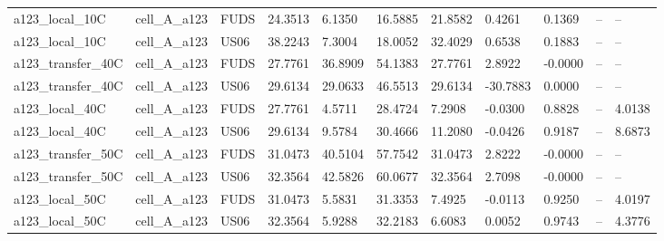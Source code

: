\begin{tabular}{lllllllllll}
a123\_local\_10C & cell\_A\_a123 & FUDS & 24.3513 & 6.1350 & 16.5885 & 21.8582 & 0.4261 & 0.1369 & -- & -- \\
a123\_local\_10C & cell\_A\_a123 & US06 & 38.2243 & 7.3004 & 18.0052 & 32.4029 & 0.6538 & 0.1883 & -- & -- \\
a123\_transfer\_40C & cell\_A\_a123 & FUDS & 27.7761 & 36.8909 & 54.1383 & 27.7761 & 2.8922 & -0.0000 & -- & -- \\
a123\_transfer\_40C & cell\_A\_a123 & US06 & 29.6134 & 29.0633 & 46.5513 & 29.6134 & -30.7883 & 0.0000 & -- & -- \\
a123\_local\_40C & cell\_A\_a123 & FUDS & 27.7761 & 4.5711 & 28.4724 & 7.2908 & -0.0300 & 0.8828 & -- & 4.0138 \\
a123\_local\_40C & cell\_A\_a123 & US06 & 29.6134 & 9.5784 & 30.4666 & 11.2080 & -0.0426 & 0.9187 & -- & 8.6873 \\
a123\_transfer\_50C & cell\_A\_a123 & FUDS & 31.0473 & 40.5104 & 57.7542 & 31.0473 & 2.8222 & -0.0000 & -- & -- \\
a123\_transfer\_50C & cell\_A\_a123 & US06 & 32.3564 & 42.5826 & 60.0677 & 32.3564 & 2.7098 & -0.0000 & -- & -- \\
a123\_local\_50C & cell\_A\_a123 & FUDS & 31.0473 & 5.5831 & 31.3353 & 7.4925 & -0.0113 & 0.9250 & -- & 4.0197 \\
a123\_local\_50C & cell\_A\_a123 & US06 & 32.3564 & 5.9288 & 32.2183 & 6.6083 & 0.0052 & 0.9743 & -- & 4.3776 \\
\hline
\end{tabular}
